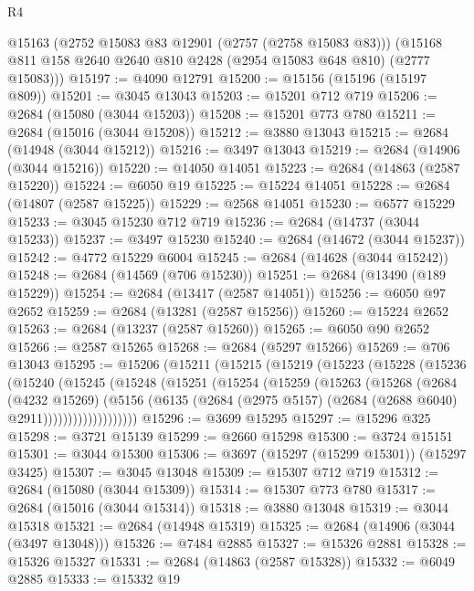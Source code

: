 \begin{lexlean}{R4}
\begin{coremodule}
      @15163
      (@2752 @15083 @83 @12901 (@2757 (@2758 @15083 @83)))
      (@15168 @811 @158 @2640 @2640 @810 @2428 (@2954 @15083 @648 @810) (@2777 @15083)))
@15197 := @4090 @12791
@15200 := @15156 (@15196 (@15197 @809))
@15201 := @3045 @13043
@15203 := @15201 @712 @719
@15206 := @2684 (@15080 (@3044 @15203))
@15208 := @15201 @773 @780
@15211 := @2684 (@15016 (@3044 @15208))
@15212 := @3880 @13043
@15215 := @2684 (@14948 (@3044 @15212))
@15216 := @3497 @13043
@15219 := @2684 (@14906 (@3044 @15216))
@15220 := @14050 @14051
@15223 := @2684 (@14863 (@2587 @15220))
@15224 := @6050 @19
@15225 := @15224 @14051
@15228 := @2684 (@14807 (@2587 @15225))
@15229 := @2568 @14051
@15230 := @6577 @15229
@15233 := @3045 @15230 @712 @719
@15236 := @2684 (@14737 (@3044 @15233))
@15237 := @3497 @15230
@15240 := @2684 (@14672 (@3044 @15237))
@15242 := @4772 @15229 @6004
@15245 := @2684 (@14628 (@3044 @15242))
@15248 := @2684 (@14569 (@706 @15230))
@15251 := @2684 (@13490 (@189 @15229))
@15254 := @2684 (@13417 (@2587 @14051))
@15256 := @6050 @97 @2652
@15259 := @2684 (@13281 (@2587 @15256))
@15260 := @15224 @2652
@15263 := @2684 (@13237 (@2587 @15260))
@15265 := @6050 @90 @2652
@15266 := @2587 @15265
@15268 := @2684 (@5297 @15266)
@15269 := @706 @13043
@15295 := @15206
    (@15211
      (@15215
        (@15219
          (@15223
            (@15228
              (@15236
                (@15240
                  (@15245
                    (@15248
                      (@15251
                        (@15254
                          (@15259
                            (@15263
                              (@15268
                                (@2684
                                  (@4232 @15269)
                                  (@5156
                                    (@6135
                                      (@2684
                                        (@2975 @5157)
                                        (@2684 (@2688 @6040) @2911)))))))))))))))))))
@15296 := @3699 @15295
@15297 := @15296 @325
@15298 := @3721 @15139
@15299 := @2660 @15298
@15300 := @3724 @15151
@15301 := @3044 @15300
@15306 := @3697 (@15297 (@15299 @15301)) (@15297 @3425)
@15307 := @3045 @13048
@15309 := @15307 @712 @719
@15312 := @2684 (@15080 (@3044 @15309))
@15314 := @15307 @773 @780
@15317 := @2684 (@15016 (@3044 @15314))
@15318 := @3880 @13048
@15319 := @3044 @15318
@15321 := @2684 (@14948 @15319)
@15325 := @2684 (@14906 (@3044 (@3497 @13048)))
@15326 := @7484 @2885
@15327 := @15326 @2881
@15328 := @15326 @15327
@15331 := @2684 (@14863 (@2587 @15328))
@15332 := @6049 @2885
@15333 := @15332 @19

\end{coremodule}
\end{lexlean}
